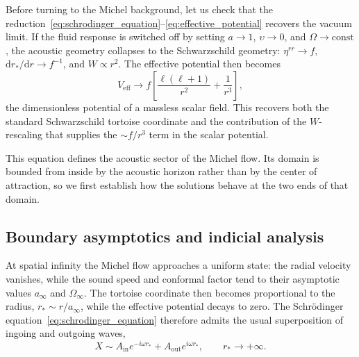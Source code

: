 \documentclass[12pt,a4paper,preprint,nopreprintline]{elsarticle}
\begin{document}
Before turning to the Michel background, let us check that the reduction~\eqref{eq:schrodinger_equation}--\eqref{eq:effective_potential} recovers the vacuum limit. If the fluid response is switched off by setting $a\rightarrow1$, $\upsilon\rightarrow0$, and $\Omega\rightarrow\mathrm{const}$, the acoustic geometry collapses to the Schwarzschild geometry: $\eta^{rr}\rightarrow f$, $\mathrm{d}r_{*}/\mathrm{d}r\rightarrow f^{-1}$, and $W\propto r^{2}$. The effective potential then becomes
\begin{equation}
    V_{\mathrm{eff}}
    \longrightarrow
    f\left[
        \frac{\ell(\ell+1)}{r^{2}}+\frac{1}{r^{3}}
    \right],
    \label{eq:scalar_schwarzschild_potential}
\end{equation}
the dimensionless potential of a massless scalar field. This recovers both the standard Schwarzschild tortoise coordinate and the contribution of the $W$-rescaling that supplies the $\sim f/r^{3}$ term in the scalar potential.

This equation defines the acoustic sector of the Michel flow. Its domain is bounded from inside by the acoustic horizon rather than by the center of attraction, so we first establish how the solutions behave at the two ends of that domain.

\subsection{Boundary asymptotics and indicial analysis}
\label{sec:boundary_asymptotics}

At spatial infinity the Michel flow approaches a uniform state: the radial velocity vanishes, while the sound speed and conformal factor tend to their asymptotic values $a_{\infty}$ and $\Omega_{\infty}$. The tortoise coordinate then becomes proportional to the radius, $r_{*}\sim r/a_{\infty}$, while the effective potential decays to zero. The Schr\"odinger equation~\eqref{eq:schrodinger_equation} therefore admits the usual superposition of ingoing and outgoing waves,
\begin{equation}
    X\sim
    A_{\mathrm{in}}e^{-i\omega r_{*}}
    +
    A_{\mathrm{out}}e^{i\omega r_{*}},
    \qquad r_{*}\rightarrow+\infty.
    \label{eq:infinity_asymptotics}
\end{equation}
\end{document}
